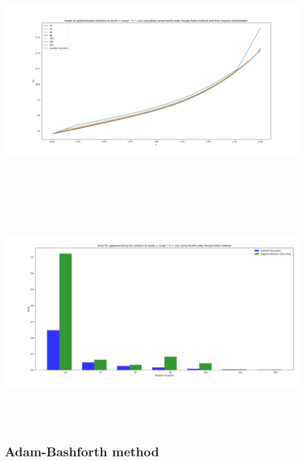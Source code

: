 \documentclass[10pt]{article}
\begin{document}
\begin{center}
\includegraphics[angle=0,height=10cm]{./img/runge_4_function.png}
\end{center}

\begin{center}
\includegraphics[angle=0,height=10cm]{./img/runge_4_error.png}
\end{center}




\subsection{Adam-Bashforth method}
\label{sec:orgdd9a132}
\end{document}
